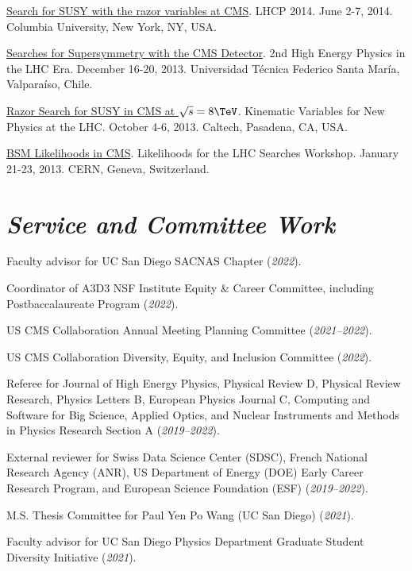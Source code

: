 \documentclass[11pt]{res}
\newcommand{\MarginText}[1]{\section{\textit{#1}}}
\begin{document}
\begin{resume}
{  \href{https://indico.cern.ch/event/279518/contributions/634785/}{Search for SUSY with the razor variables at CMS}. LHCP 2014. June 2-7, 2014. Columbia University, New York, NY, USA.

  \href{https://indico.cern.ch/event/252857/contributions/1579321/}{Searches for Supersymmetry with the CMS Detector}. 2nd High Energy Physics in the LHC Era. December 16-20, 2013. Universidad T\'{e}cnica Federico Santa Mar\'{i}a, Valpara\'{i}so, Chile.

  \href{https://indico.cern.ch/event/261650/contributions/586374/}{Razor Search for SUSY in CMS at $\sqrt{s}=8\TeV$}. Kinematic Variables for New Physics at the LHC. October 4-6, 2013. Caltech, Pasadena, CA, USA.

  \href{https://indico.cern.ch/event/218693/contributions/1520333/}{BSM Likelihoods in CMS}. Likelihoods for the LHC Searches Workshop. January 21-23, 2013. CERN, Geneva, Switzerland.

  }{}


  \MarginText{Service and Committee Work}

  Faculty advisor for UC San Diego SACNAS Chapter (\textit{2022}).

  Coordinator of A3D3 NSF Institute Equity \& Career Committee, including Postbaccalaureate Program (\textit{2022}).

  US CMS Collaboration Annual Meeting Planning Committee (\textit{2021--2022}).

  US CMS Collaboration Diversity, Equity, and Inclusion Committee (\textit{2022}).

  Referee for Journal of High Energy Physics, Physical Review D, Physical Review Research, Physics Letters B, European Physics Journal C, Computing and Software for Big Science, Applied Optics, and Nuclear Instruments and Methods in Physics Research Section A (\textit{2019--2022}).

  External reviewer for Swiss Data Science Center (SDSC), French National Research Agency (ANR), US Department of Energy (DOE) Early Career Research Program, and European Science Foundation (ESF) (\textit{2019--2022}).

  M.S. Thesis Committee for Paul Yen Po Wang (UC San Diego) (\textit{2021}).

  Faculty advisor for UC San Diego Physics Department Graduate Student Diversity Initiative (\textit{2021}).


\end{resume}
\end{document}
